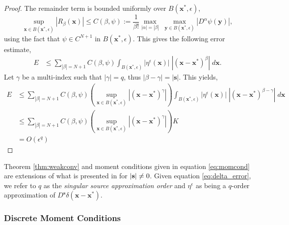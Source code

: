 \begin{proof}
The remainder term is bounded uniformly over $B(\mathbf x^*,\epsilon)$,
\[
	\underset{\mathbf x\in B(\mathbf x^*,\epsilon)}{\sup} |R_\beta(\mathbf x)| \le C(\beta,\psi) := \frac{1}{\beta!} \max_{|\alpha|=|\beta|} \; \max_{\mathbf y\in B(\mathbf x^*,\epsilon)} |D^{\alpha}\psi(\mathbf y)|,
\]
using the fact that $\psi\in C^{N+1}$ in $B(\mathbf x^*,\epsilon)$.
This gives the following error estimate,
\begin{align*}
	 E
	 & \le \sum_{|\beta|=N+1} C(\beta,\psi) \int_{B(\mathbf x^*,\epsilon)} 
	  |\eta^\epsilon(\mathbf x)| \; |(\mathbf x-\mathbf x^*)^\beta| \; d\mathbf x.
\end{align*}
Let $\gamma$ be a multi-index such that $|\gamma|=q$, thus $|\beta-\gamma| = |\mathbf s|$.
This yields,
\begin{align*}
	E
	&\le \sum_{|\beta|=N+1} C(\beta,\psi) \left( \sup_{\mathbf x\in B(\mathbf x^*,\epsilon)} \left|(\mathbf x-\mathbf x^*)^{\gamma}\right|\right) 
	\int_{B(\mathbf x^*,\epsilon)} |\eta^\epsilon(\mathbf x)| \; |(\mathbf x-\mathbf x^*)^{\beta-\gamma}| \; d\mathbf x \\
	&\le \sum_{|\beta|=N+1} C(\beta,\psi) \left( \sup_{\mathbf x\in B(\mathbf x^*,\epsilon)} \left|(\mathbf x-\mathbf x^*)^{\gamma}\right|\right)  K\\
	&= O(\epsilon^q)
\end{align*}
\end{proof}

Theorem \ref{thm:weakconv} and moment conditions given in equation \ref{eq:momcond} are extensions of what is presented in \cite{hoss:16} for $|{\bf s}|\neq0$.
Given equation \ref{eq:delta_error}, we refer to $q$ as the \emph{singular source approximation order} and $\eta^\epsilon$ as being a $q$-order approximation of $D^{\mathbf s}\delta(\mathbf x-\mathbf x^*)$.


\subsubsection{Discrete Moment Conditions}


